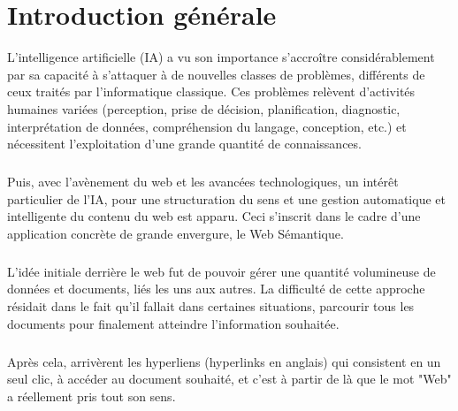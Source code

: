 \documentclass[12pt, a4paper, oneside]{book}
\begin{document}
\frontmatter
\listoffigures
\tableofcontents

\mainmatter

\chapter{Introduction générale}

L'intelligence artificielle (IA) a vu son importance s'accroître considérablement
par sa capacité à s'attaquer à de nouvelles classes de problèmes, différents de ceux
traités par l'informatique classique. Ces problèmes relèvent d'activités humaines
variées (perception, prise de décision, planification, diagnostic, interprétation de
données, compréhension du langage, conception, etc.) et nécessitent l'exploitation d'une grande quantité de connaissances.\citep{IA}

\paragraph{}

Puis, avec l'avènement du web et les avancées technologiques, un intérêt
particulier de l'IA, pour une structuration du sens et une gestion automatique et
intelligente du contenu du web est apparu. Ceci s'inscrit dans le cadre d'une
application concrète de grande envergure, le Web Sémantique. \citep{avenement}

\paragraph{}

L'idée initiale derrière le web fut de pouvoir gérer une quantité volumineuse de données et documents, liés les uns aux autres. La difficulté de cette approche résidait dans le fait qu'il fallait dans certaines situations, parcourir tous les documents pour finalement atteindre l'information souhaitée.



\paragraph{}

Après cela, arrivèrent les hyperliens (hyperlinks en anglais) qui consistent en un seul clic, à accéder
au document souhaité, et c'est à partir de là que le mot "Web" a réellement pris tout son sens.


\paragraph{}
\end{document}
